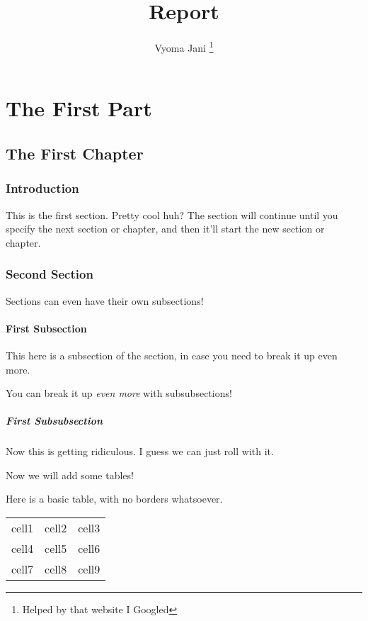 \documentclass{report}
\title{Report}
\author{Vyoma Jani \thanks{Helped by that website I Googled}}
\begin{document}
\maketitle

\tableofcontents

\part{The First Part}

\chapter{The First Chapter}

\section{Introduction}

This is the first section. Pretty cool huh? The section will continue until you specify the next section or chapter, and then it'll start the new section or chapter.

\section{Second Section}

Sections can even have their own subsections! 

\subsection{First Subsection}

This here is a subsection of the section, in case you need to break it up even more. 

You can break it up \textit{even more} with subsubsections!

\subsubsection{First Subsubsection}

Now this is getting ridiculous. I guess we can just roll with it.

Now we will add some tables!

Here is a basic table, with no borders whatsoever. 

\begin{center}

\begin{tabular}{c rl}

cell1 & cell2 & cell3 \\
cell4 & cell5 & cell6 \\
cell7 & cell8 & cell9

\end{tabular}

\end{center}
\end{document}
